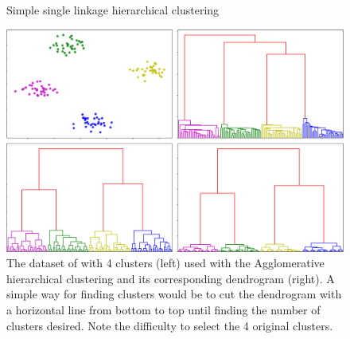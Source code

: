 \begin{figure}[h]
\begin{center}
   \caption{Simple single linkage hierarchical clustering}
   \label{algo:single_linkage_hier_algo}
\end{center}
\vspace{-15pt}
\end{figure}
 \begin{figure}[h]
 \center
 \includegraphics[scale=0.35]{TeX_files/dendrogram.png}
 \caption{The dataset of  with 4 clusters (left) used with the Agglomerative hierarchical clustering and its corresponding dendrogram (right). A simple way for finding clusters would be to cut the dendrogram with a horizontal line from bottom to top until finding the number of clusters desired. Note the difficulty to select the 4 original clusters.}
 \label{dendrogram_graph}
 \end{figure}

